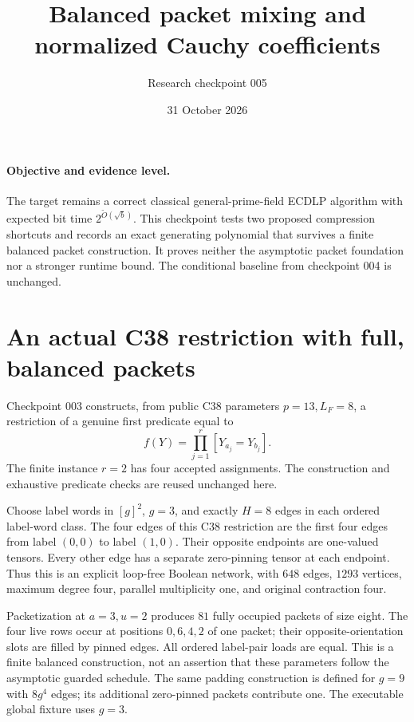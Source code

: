 \documentclass[11pt]{article}
\title{Balanced packet mixing and normalized Cauchy coefficients}
\author{Research checkpoint 005}
\date{31 October 2026}
\begin{document}
\maketitle

\paragraph{Objective and evidence level.}
The target remains a correct classical general-prime-field ECDLP algorithm
with expected bit time $2^{\widetilde O(\sqrt b)}$. This checkpoint tests
two proposed compression shortcuts and records an exact generating
polynomial that survives a finite balanced packet construction. It proves
neither the asymptotic packet foundation nor a stronger runtime bound.
The conditional baseline from checkpoint 004 is unchanged.

\section{An actual C38 restriction with full, balanced packets}
Checkpoint 003 constructs, from public C38 parameters $p=13,L_F=8$,
a restriction of a genuine first predicate equal to
\[
 f(Y)=\prod_{j=1}^r [Y_{a_j}=Y_{b_j}].
\]
The finite instance $r=2$ has four accepted assignments. The construction
and exhaustive predicate checks are reused unchanged here.

Choose label words in $[g]^2$, $g=3$, and exactly $H=8$ edges in each
ordered label-word class. The four edges of this C38 restriction are the
first four edges from label $(0,0)$ to label $(1,0)$. Their opposite
endpoints are one-valued tensors. Every other edge has a separate
zero-pinning tensor at each endpoint. Thus this is an explicit loop-free
Boolean network, with $648$ edges, $1293$ vertices, maximum degree four,
parallel multiplicity one, and original contraction four.

Packetization at $a=3,u=2$ produces $81$ fully occupied packets of size
eight. The four live rows occur at positions $0,6,4,2$ of one packet;
their opposite-orientation slots are filled by pinned edges. All ordered
label-pair loads are equal. This is a finite balanced construction, not
an assertion that these parameters follow the asymptotic guarded schedule.
The same padding construction is defined for $g=9$ with $8g^4$ edges;
its additional zero-pinned packets contribute one. The executable global
fixture uses $g=3$.
\end{document}
